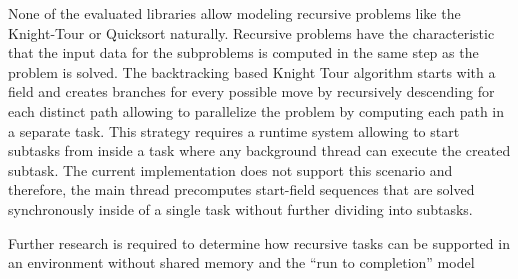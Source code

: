 None of the evaluated libraries allow modeling recursive problems like the Knight-Tour or Quicksort naturally. Recursive problems have the characteristic that the input data for the subproblems is computed in the same step as the problem is solved. The backtracking based Knight Tour algorithm starts with a field and creates branches for every possible move by recursively descending for each distinct path allowing to parallelize the problem by computing each path in a separate task.  This strategy requires a runtime system allowing to start subtasks from inside a task where any background thread can execute the created subtask. The current implementation does not support this scenario and therefore, the main thread precomputes start-field sequences that are solved synchronously inside of a single task without further dividing into subtasks.

Further research is required to determine how recursive tasks can be supported in an environment without shared memory and the \enquote{run to completion} model